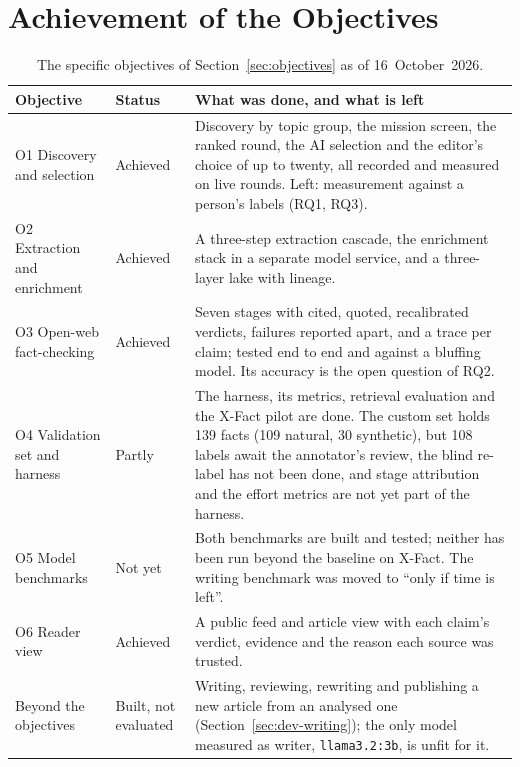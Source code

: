 
\section{Achievement of the Objectives}
\label{sec:objectives-achieved}

\begin{table}[ht]
\centering
\small
\caption{The specific objectives of Section~\ref{sec:objectives} as of
16~October~2026.}
\label{tab:objectives-achieved}
\begin{tabularx}{\linewidth}{@{}llX@{}}
\toprule
\textbf{Objective} & \textbf{Status} & \textbf{What was done, and what is left} \\
\midrule
O1 Discovery and selection & Achieved & Discovery by topic group, the
mission screen, the ranked round, the AI selection and the editor's
choice of up to twenty, all recorded and measured on live rounds. Left:
measurement against a person's labels (RQ1, RQ3). \\
\addlinespace
O2 Extraction and enrichment & Achieved & A three-step extraction
cascade, the enrichment stack in a separate model service, and a
three-layer lake with lineage. \\
\addlinespace
O3 Open-web fact-checking & Achieved & Seven stages with cited,
quoted, recalibrated verdicts, failures reported apart, and a trace per
claim; tested end to end and against a bluffing model. Its accuracy is
the open question of RQ2. \\
\addlinespace
O4 Validation set and harness & Partly & The harness, its metrics,
retrieval evaluation and the X-Fact pilot are done. The custom set
holds 139 facts (109 natural, 30 synthetic), but 108 labels await the
annotator's review, the blind re-label has not been done, and stage
attribution and the effort metrics are not yet part of the harness. \\
\addlinespace
O5 Model benchmarks & Not yet & Both benchmarks are built and tested;
neither has been run beyond the baseline on X-Fact. The writing
benchmark was moved to ``only if time is left''. \\
\addlinespace
O6 Reader view & Achieved & A public feed and article view with each
claim's verdict, evidence and the reason each source was trusted. \\
\addlinespace
Beyond the objectives & Built, not evaluated & Writing, reviewing,
rewriting and publishing a new article from an analysed one
(Section~\ref{sec:dev-writing}); the only model measured as writer,
\texttt{llama3.2:3b}, is unfit for it. \\
\bottomrule
\end{tabularx}
\end{table}
